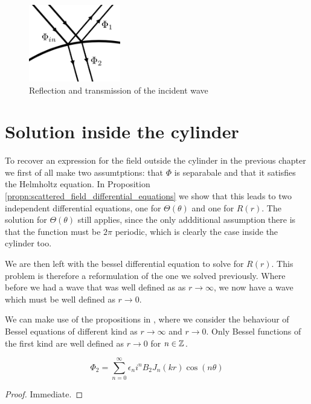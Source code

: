 \begin{figure} \centering
  \includegraphics[width=4cm]{../figures/transmission_diagram}
  \caption{Reflection and transmission of the incident wave}
\end{figure}

%
%
\section{Solution inside the cylinder}

To recover an expression for the field outside the cylinder in the previous chapter we first of all make two assumtptions: that $\Phi$ is separabale and that it satisfies the Helmholtz equation. In Proposition \ref{propn:scattered_field_differential_equations} we show that this leads to two independent differential equations, one for $\Theta(\theta)$ and one for $R(r)$. The solution for $\Theta(\theta)$ still applies, since the only addditional assumption there is that the function must be $2 \pi$ periodic, which is clearly the case inside the cylinder too.

We are then left with the bessel differential equation to solve for $R(r)$. This problem is therefore a reformulation of the one we solved previously. Where before we had a wave that was well defined as as $r\rightarrow\infty$, we now have a wave which must be well defined as $r\rightarrow 0$.

We can make use of the propositions in , where we consider the behaviour of Bessel equations of different kind as $r\rightarrow\infty$ and $r\rightarrow 0$. Only Bessel functions of the first kind are well defined as $r\rightarrow 0$ for $n\in \mathbb{Z}$.

\begin{propn}
\begin{equation}
  \Phi_2 = \sum_{n=0}^{\infty} \epsilon_n i^n B_2 J_n(kr) \cos(n\theta)
\end{equation}
\end{propn}
\begin{proof}
  Immediate.
\end{proof}

